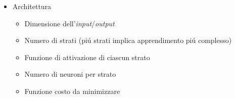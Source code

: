 \begin{frame}[t,fragile]
{{{\begin{minipage}[t]{\textwidth}
\begin{minipage}[t]{.4\textwidth}
\begin{itemize}[leftmargin=10pt,align=right]
\begin{minipage}[t]{\textwidth}
					\end{minipage}
				\end{itemize}
				\end{minipage}
				\hfill
				\begin{minipage}[t]{.5\textwidth}
					\begin{itemize}[leftmargin=10pt,align=right]
						\item[\alert{\faHandORight}] Architettura
							\begin{itemize}[leftmargin=20pt,align=right]
								\item[\alert{\faHandORight}] Dimensione dell'\emph{input}/\emph{output}
			 					\item[\alert{\faHandORight}] Numero di strati (pi\'{u} strati implica apprendimento pi\'{u} complesso)
								\item[\alert{\faHandORight}] Funzione di attivazione di ciascun strato
								\item[\alert{\faHandORight}] Numero di neuroni per strato
								\item[\alert{\faHandORight}] Funzione costo da minimizzare
							\end{itemize}
					\end{itemize}
				\end{minipage}
		\end{minipage}
		}
	}
}
\end{frame}
%
